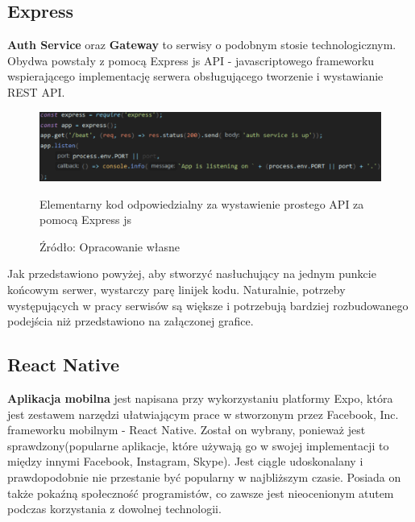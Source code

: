 \subsection{Express}
\textbf{Auth Service} oraz \textbf{Gateway} to serwisy o podobnym stosie technologicznym. Obydwa powstały z pomocą Express js API - javascriptowego frameworku wspierającego implementację serwera obsługującego tworzenie i wystawianie REST API.
\begin{figure}[H]
	\centering
	\includegraphics[width=\linewidth]{express_simple.pdf}
	\caption{\centering Elementarny kod odpowiedzialny za wystawienie prostego API za pomocą Express js}
	\caption*{\centering Źródło: {Opracowanie własne}}
\end{figure}
Jak przedstawiono powyżej, aby stworzyć nasłuchujący na jednym punkcie końcowym serwer, wystarczy parę linijek kodu. Naturalnie, potrzeby występujących w pracy serwisów są większe i potrzebują bardziej rozbudowanego podejścia niż przedstawiono na załączonej grafice.

\subsection{React Native}
\textbf{Aplikacja mobilna} jest napisana przy wykorzystaniu platformy Expo, która jest zestawem narzędzi ułatwiającym prace w stworzonym przez Facebook, Inc. frameworku mobilnym - React Native. Został on wybrany, ponieważ jest sprawdzony(popularne aplikacje, które używają go w swojej implementacji to między innymi Facebook, Instagram, Skype). Jest ciągle udoskonalany i prawdopodobnie nie przestanie być popularny w najbliższym czasie. Posiada on także pokaźną społeczność programistów, co zawsze jest nieocenionym atutem podczas korzystania z dowolnej technologii.

